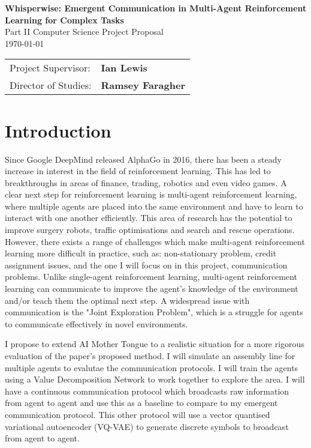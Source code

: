 \documentclass[20pt]{article}
\begin{document}
\begin{center}
  \Huge
  \textbf{Whisperwise: Emergent Communication in Multi-Agent Reinforcement Learning for Complex Tasks} \\[4mm]
  \Large
  Part II Computer Science Project Proposal \\[2mm]
  \today \\[8mm]
\end{center}

{\large
\begin{tabular}{ll}
  Project Supervisor:  & \bf Ian Lewis                \\
  Director of Studies: & \bf Ramsey Faragher                   \\
\end{tabular}
}



\section{Introduction}

\large
Since Google DeepMind released AlphaGo in 2016, there has been a steady increase in interest in the field of reinforcement learning. This has led to breakthroughs in areas of finance, trading, robotics and even video games. A clear next step for reinforcement learning is multi-agent reinforcement learning, where multiple agents are placed into the same environment and have to learn to interact with one another efficiently. This area of research has the potential to improve surgery robots, traffic optimisations and search and rescue operations. However, there exists a range of challenges which make multi-agent reinforcement learning more difficult in practice, such as: non-stationary problem, credit assignment issues, and the one I will focus on in this project, communication problems. Unlike single-agent reinforcement learning, multi-agent reinforcement learning can communicate to improve the agent's knowledge of the environment and/or teach them the optimal next step. A widespread issue with communication is the "Joint Exploration Problem", which is a struggle for agents to communicate effectively in novel environments.

I propose to extend AI Mother Tongue\cite{AIMotherTongue} to a realistic situation for a more rigorous evaluation of the paper's proposed method. I will simulate an assembly line for multiple agents to evalutae the communication protocols. I will train the agents using a Value Decomposition Network to work together to explore the area. I will have a continuous communication protocol which broadcasts raw information from agent to agent and use this as a baseline to compare to my emergent communication protocol. This other protocol will use a vector quantised variational autoencoder (VQ-VAE) to generate discrete symbols to broadcast from agent to agent.
\end{document}
